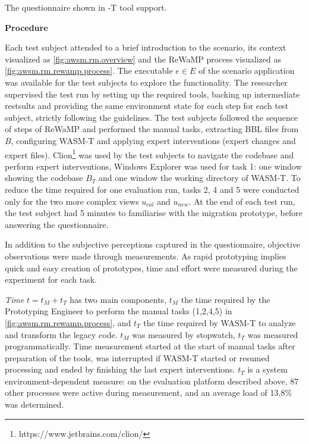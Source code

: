 The questionnaire shown in -T tool support.


\textbf{Procedure}

Each test subject attended to a brief introduction to the scenario, its context visualized as \cref{fig:awsm.rm.overview} and the ReWaMP process visualized as \cref{fig:awsm.rm.rewamp.process}.
The executable \(e \in E\) of the scenario application was available for the test subjects to explore the functionality.
The researcher supervised the test run by setting up the required tools, backing up intermediate restsults and providing the same environment state for each step for each test subject, strictly following the guidelines.
The test subjects followed the sequence of steps of ReWaMP and performed the manual tasks, extracting BBL files from \(B\), configuring WASM-T and applying expert interventions (expert changes and expert files).
Clion\footnote{https://www.jetbrains.com/clion/} was used by the test subjects to navigate the codebase and perform expert interventions, Windows Explorer was used for task 1: one window showing the codebase \(B_T\) and one window the working directory of WASM-T.
To reduce the time required for one evaluation run, tasks 2, 4 and 5 were conducted only for the two more complex views \(u_{cal}\) and \(u_{new}\).
At the end of each test run, the test subject had 5 minutes to familiarise with the migration prototype, before answering the questionnaire.

In addition to the subjective perceptions captured in the questionnaire, objective observations were made through measurements.
As rapid prototyping implies quick and easy creation of prototypes, time and effort were measured during the experiment for each task.

\emph{Time} \(t = t_M + t_T\) has two main components, \(t_M\) the time required by the Prototyping Engineer to perform the manual tasks (1,2,4,5) in \cref{fig:awsm.rm.rewamp.process}, and \(t_T\) the time required by WASM-T to analyze and transform the legacy code.
\(t_M\) was measured by stopwatch, \(t_T\) was measured programmatically.
Time measurement started at the start of manual tasks after preparation of the tools, was interrupted if WASM-T started or resumed processing and ended by finishing the last expert interventions.
\(t_T\) is a system environment-dependent measure: on the evaluation platform described above, 87 other processes were active during measurement, and an average load of 13,8\% was determined.

